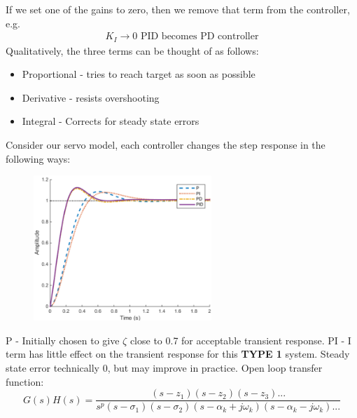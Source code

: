 \documentclass[class=report, crop=false, 12pt,a4paper]{standalone}
\begin{document}
If we set one of the gains to zero, then we remove that term from the controller, e.g. 
\begin{align}
  K_I \rightarrow 0 \textrm{ PID becomes PD controller}
\end{align}
Qualitatively, the three terms can be thought of as follows:
\begin{itemize}
  \item Proportional - tries to reach target as soon as possible
  \item Derivative - resists overshooting
  \item Integral - Corrects for steady state errors
\end{itemize}
Consider our servo model, each controller changes the step response in the following ways: 
\begin{figure}[H]
  \centerline{\includegraphics[width = 0.6\textwidth]{../img/diagram133.png}}
  \caption{}
\end{figure}
P - Initially chosen to give $\zeta$ close to 0.7 for acceptable transient response. PI - I term has little effect on the transient response for this \textbf{TYPE 1} system. Steady state error technically 0, but may improve in practice. Open loop transfer function:
\begin{equation}
  G(s)H(s) = \frac{\left(s-z_1\right) \left(s-z_2\right) \left(s-z_3\right)...}{s^p \left(s-\sigma_1\right) \left(s-\sigma_2\right) \left(s-\alpha_k + j \omega_k\right) \left(s- \alpha_k - j \omega_k\right)...}
\end{equation}
\end{document}
